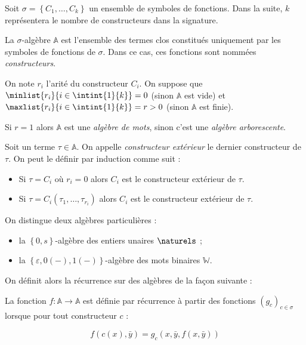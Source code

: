 \documentclass{report}
\newcommand{\bbA}{\mathbb{A}}
\begin{document}
			\begin{definition}
				\label{def:algebre}
				Soit $\sigma = \left\lbrace C_1, \dots, C_k \right\rbrace$ un ensemble de symboles de fonctions. Dans la suite, $k$ représentera le nombre de constructeurs dans la signature.
				
				La $\sigma$-algèbre $\bbA$ est l'ensemble des termes clos constitués uniquement par les symboles de fonctions de $\sigma$. Dans ce cas, ces fonctions sont nommées \emph{constructeurs}. 
				
				On note $r_i$ l'arité du constructeur $C_i$. On suppose que $\minlist{r_i}{i\in\intint{1}{k}} = 0$ (sinon $\bbA$ est vide) et $\maxlist{r_i}{i\in\intint{1}{k}} = r > 0$ (sinon $\bbA$ est finie).
				
				Si $r = 1$ alors $\mathbb{A}$ est une \emph{algèbre de mots}, sinon c'est une \emph{algèbre arborescente}.
				
				Soit un terme $\tau \in \bbA$. On appelle \emph{constructeur extérieur} le dernier constructeur de $\tau$. On peut le définir par induction comme suit :
				
				\begin{itemize}[itemsep=-1mm]
					\item 	Si $\tau = C_i$ où $r_i = 0$ alors $C_i$ est le constructeur extérieur de $\tau$.
					\item 	Si $\tau = C_i(\tau_1, \dots, \tau_{r_i})$ alors $C_{i}$ est le constructeur extérieur de $\tau$.
				\end{itemize}
			\end{definition}
			
			
			\begin{example} On distingue deux algèbres particulières :
				\begin{itemize}[itemsep=-1mm]
					\item 	la $\left\lbrace 0, s \right\rbrace$-algèbre des entiers unaires $\naturels$ ;
					\item 	la $\left\lbrace \varepsilon, 0(-), 1(-)\right\rbrace$-algèbre des mots binaires $\mathbb{W}$.
				\end{itemize}
			\end{example}
	
			On définit alors la récurrence sur des algèbres de la façon suivante :
			
			\begin{definition}
				La fonction $f : \bbA \to \bbA$ est définie par récurrence à partir des fonctions $\left(g_c\right)_{c \in \sigma}$ lorsque pour tout constructeur $c$ :
				
				\[
					f\left(c(x), \bar{y}\right) = g_c\left( x, \bar{y}, f(x, \bar{y}) \right)
				\]
			\end{definition}
\end{document}
